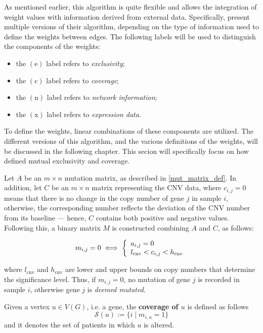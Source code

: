 As mentioned earlier, this algorithm is quite flexible and allows the integration of weight values with information derived from external data. Specifically, \textcite{c3} present multiple versions of their algorithm, depending on the type of information used to define the weights between edges. The following labels will be used to distinguish the components of the weights:

\begin{itemize}
    \item the $(\mathrm e)$ label refers to \textit{exclusivity};
    \item the $(\mathrm c)$ label refers to \textit{coverage};
    \item the $(\mathrm n)$ label refers to \textit{network information};
    \item the $(\mathrm x)$ label refers to \textit{expression data}.
\end{itemize}

To define the weights, linear combinations of these components are utilized. The different versions of this algorithm, and the various definitions of the weights, will be discussed in the following chapter. This secion will specifically focus on how \textcite{c3} defined mutual exclusivity and coverage.

Let $A$ be an $m \times n$ mutation matrix, as described in \cref{mut_matrix_def}. In addition, let $C$ be an $m \times n$ matrix representing the CNV data, where $c_{i, j} = 0$ means that there is no change in the copy number of gene $j$ in sample $i$, otherwise, the corresponding number reflects the deviation of the CNV number from its baseline --- hence, $C$ contains both positive and negative values. Following this, a binary matrix $M$ is constructed combining $A$ and $C$, as follows:

\begin{equation}
    m_{i, j} = 0 \iff \soe{l}{a_{i, j} = 0 \\ l_{\mathrm{cnv}} < c_{i, j} < h_{\mathrm{cnv}}}
\end{equation}

where $l_{\mathrm{cnv}}$ and $h_{\mathrm{cnv}}$ are lower and upper bounds on copy numbers that determine the significance level. Thus, if $m_{i, j} = 0$, no mutation of gene $j$ is recorded in sample $i$, otherwise gene $j$ is \textit{deemed mutated}.

\begin{definition}
    Given a vertex $u \in V(G)$, i.e. a gene, the \textbf{coverage of $u$} is defined as follows $$\mathscr{S}(u) := \{i \mid m_{i, u} = 1\}$$ and it denotes the set of patients in which $u$ is altered.
\end{definition}

